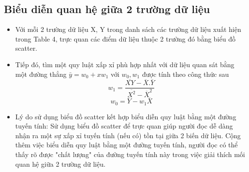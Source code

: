 \documentclass[a4paper, 12pt]{article}
\begin{document}
    \subsection{Biểu diễn quan hệ giữa 2 trường dữ liệu}

    \begin{itemize}
        \item Với mỗi 2 trường dữ liệu X, Y trong danh sách các trường dữ liệu xuất hiện trong Table 4, trực quan các điểm dữ liệu thuộc 2 trường đó bằng biểu đồ scatter.
        \item Tiếp đó, tìm một quy luật xấp xỉ phù hợp nhất với dữ liệu quan sát bằng một đường thẳng $\bar{y} = w_0 + xw_1$ với $w_0, w_1$ được tính theo công thức sau
        $$w_1 = \frac{\overline{XY} - \overline{X}.\overline{Y}}{\overline{X^2}-\overline{X}^2}$$
        $$w_0 = \overline{Y} - w_1\overline{X}$$

        \item Lý do sử dụng biểu đồ scatter kết hợp biểu diễn quy luật bằng một đường tuyến tính: Sử dụng biểu đồ scatter để trực quan giúp người đọc dễ dàng nhận ra một sự xấp xỉ tuyến tính (nếu có) tồn tại giữa 2 biến dữ liệu. Cộng thêm việc biểu diễn quy luật bằng một đường tuyến tính, người đọc có thể thấy rõ được "chất lượng" của đường tuyến tính này trong việc giải thích mối quan hệ giữa 2 trường dữ liệu.


\end{itemize}
\end{document}

